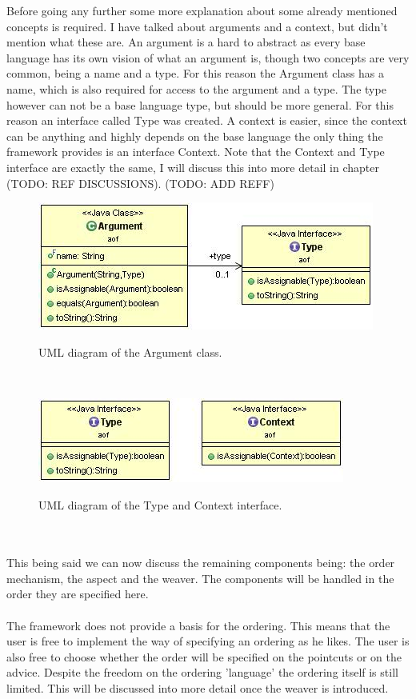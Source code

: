 \documentclass[a4paper]{report}
\begin{document}
Before going any further some more explanation about some already mentioned concepts is required. I have talked about arguments and a context, but didn't mention what these are. An argument is a hard to abstract as every base language has its own vision of what an argument is, though two concepts are very common, being a name and a type. For this reason the Argument class has a name, which is also required for access to the argument and a type. The type however can not be a base language type, but should be more general. For this reason an interface called Type was created. A context is easier, since  the context can be anything and highly depends on the base language the only thing the framework provides is an interface Context. Note that the Context and Type interface are exactly the same, I will discuss this into more detail in chapter (TODO: REF DISCUSSIONS). (TODO: ADD REFF)
\begin{figure}[h!]
\centering
\includegraphics[scale=0.7]{images/AOF/Argument.jpg}
\label{fig:Argument}
\caption{UML diagram of the Argument class.}
\end{figure}\\
\begin{figure}[h!]
\centering
\includegraphics[scale=0.7]{images/AOF/Type-Context.jpg}
\label{fig:Type-Context}
\caption{UML diagram of the Type and Context interface.}
\end{figure}\\
\\
This being said we can now discuss the remaining components being: the order mechanism, the aspect and the weaver. The components will be handled in the order they are specified here.\\
\\
The framework does not provide a basis for the ordering. This means that the user is free to implement the way of specifying an ordering as he likes. The user is also free to choose whether the order will be specified on the pointcuts or on the advice. Despite the freedom on the ordering 'language' the ordering itself is still limited. This will be discussed into more detail once the weaver is introduced.\\
\end{document}
